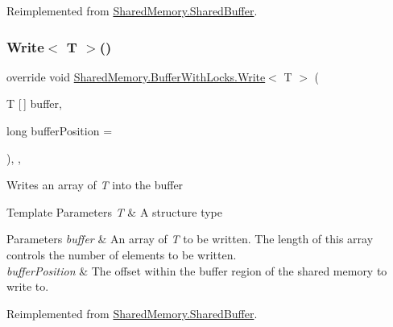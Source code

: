Reimplemented from \hyperlink{class_shared_memory_1_1_shared_buffer_a82edbe6f30b012bc93f098db46a582ec}{Shared\+Memory.\+Shared\+Buffer}.

\mbox{\label{class_shared_memory_1_1_buffer_with_locks_a8abfbb585b8bdea85b9ff71111b55679}} 
\subsubsection{\texorpdfstring{Write$<$ T $>$()}{Write< T >()}\hspace{0.1cm}{\footnotesize\ttfamily [2/2]}}
{\footnotesize\ttfamily override void \hyperlink{class_shared_memory_1_1_buffer_with_locks_a13ed00d01404247565ad3caf1fc4a032}{Shared\+Memory.\+Buffer\+With\+Locks.\+Write}$<$ T $>$ (\begin{DoxyParamCaption}\item[{T \mbox{[}$\,$\mbox{]}}]{buffer,  }\item[{long}]{buffer\+Position = {} }\end{DoxyParamCaption})\hspace{0.3cm}{\ttfamily [inline]}, {\ttfamily [protected]}, {\ttfamily [virtual]}}



Writes an array of {\itshape T}  into the buffer 


\begin{DoxyTemplParams}{Template Parameters}
{\em T} & A structure type\\
\hline
\end{DoxyTemplParams}

\begin{DoxyParams}{Parameters}
{\em buffer} & An array of {\itshape T}  to be written. The length of this array controls the number of elements to be written.\\
\hline
{\em buffer\+Position} & The offset within the buffer region of the shared memory to write to.\\
\hline
\end{DoxyParams}


Reimplemented from \hyperlink{class_shared_memory_1_1_shared_buffer_aff9ac6982aca4308738395c9a583d50e}{Shared\+Memory.\+Shared\+Buffer}.



